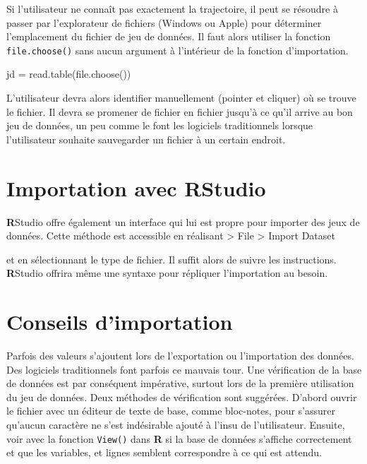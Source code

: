 \documentclass[
]{book}
\newenvironment{Shaded}{}{}
\newcommand{\FunctionTok}[1]{#1}
\newcommand{\NormalTok}[1]{#1}
\newcommand{\OtherTok}[1]{#1}
\begin{document}
Si l'utilisateur ne connaît pas exactement la trajectoire, il peut se résoudre à passer par l'explorateur de fichiers (Windows ou Apple) pour déterminer l'emplacement du fichier de jeu de données. Il faut alors utiliser la fonction \texttt{file.choose()} sans aucun argument à l'intérieur de la fonction d'importation.

\begin{Shaded}
\begin{Highlighting}[]
\NormalTok{jd }\OtherTok{=} \FunctionTok{read.table}\NormalTok{(}\FunctionTok{file.choose}\NormalTok{())}
\end{Highlighting}
\end{Shaded}

L'utilisateur devra alors identifier manuellement (pointer et cliquer) où se trouve le fichier. Il devra se promener de fichier en fichier jusqu'à ce qu'il arrive au bon jeu de données, un peu comme le font les logiciels traditionnels lorsque l'utilisateur souhaite sauvegarder un fichier à un certain endroit.

\hypertarget{importation-avec-rstudio}{%
\section{\texorpdfstring{Importation avec \textbf{R}Studio}{Importation avec RStudio}}\label{importation-avec-rstudio}}

\textbf{R}Studio offre également un interface qui lui est propre pour importer des jeux de données. Cette méthode est accessible en réalisant
\textgreater{} File
\textgreater{} Import Dataset

et en sélectionnant le type de fichier. Il suffit alors de suivre les instructions. \textbf{R}Studio offrira même une syntaxe pour répliquer l'importation au besoin.

\hypertarget{conseils-dimportation}{%
\section{Conseils d'importation}\label{conseils-dimportation}}

Parfois des valeurs s'ajoutent lors de l'exportation ou l'importation des données. Des logiciels traditionnels font parfois ce mauvais tour. Une vérification de la base de données est par conséquent impérative, surtout lors de la première utilisation du jeu de données. Deux méthodes de vérification sont suggérées. D'abord ouvrir le fichier avec un éditeur de texte de base, comme bloc-notes, pour s'assurer qu'aucun caractère ne s'est indésirable ajouté à l'insu de l'utilisateur. Ensuite, voir avec la fonction \texttt{View()} dans \textbf{R} si la base de données s'affiche correctement et que les variables, et lignes semblent correspondre à ce qui est attendu.
\end{document}

